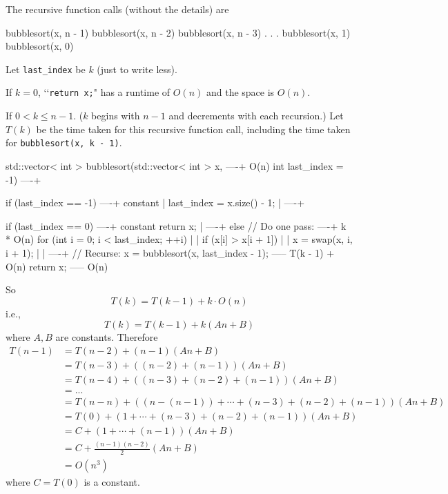 The recursive function calls (without the details) are
\begin{console}
bubblesort(x, n - 1) 
bubblesort(x, n - 2)
bubblesort(x, n - 3)
.
.
.
bubblesort(x, 1)
bubblesort(x, 0)
\end{console}
Let \verb!last_index! be $k$ (just to write less).

If $k = 0$,
\lq\lq \verb!return x;!" has a runtime of $O(n)$
and the space is $O(n)$.

If $0 < k \leq n - 1$.
($k$ begins with $n - 1$ and decrements with each
recursion.)
Let $T(k)$ be the time taken for this recursive
function call, including the time taken for 
\verb!bubblesort(x, k - 1)!.
\begin{console}[fontsize=\scriptsize]
                                                     
std::vector< int > bubblesort(std::vector< int > x, ----+ O(n) 
                              int last_index = -1)  ----+
{
    if (last_index == -1)                           ----+ constant
    {                                                   |
        last_index = x.size() - 1;                      |
    }                                               ----+

    if (last_index == 0)
    {                                               ----+ constant
        return x;                                       |
    }                                               ----+
    else                                            
    {                                               
        // Do one pass:                             ----+ k * O(n) 
        for (int i = 0; i < last_index; ++i)            |
        {                                               |
            if (x[i] > x[i + 1])                        |
            {                                           |
                x = swap(x, i, i + 1);                  |
            }                                           |
        }                                           ----+
        // Recurse:                                 
        x = bubblesort(x, last_index - 1);          ----- T(k - 1) + O(n) 
        return x;                                   ----- O(n)
    }
}
\end{console}
So
\[
T(k) = T(k - 1) + k \cdot O(n)
\]
i.e.,
\[
T(k) = T(k - 1) + k(An + B)
\]
where $A,B$ are constants.
Therefore
\begin{align*}
T(n - 1)
&= T(n - 2) + (n - 1)(An + B) \\
&= T(n - 3) + ((n-2)+(n-1))(An + B) \\
&= T(n - 4) + ((n - 3) + (n-2) + (n-1))(An + B) \\
&= ... \\
&= T(n - n) + ((n - (n-1)) + \cdots + (n - 3) + (n-2) + (n-1))(An + B) \\
&= T(0) + (1 + \cdots + (n - 3) + (n-2) + (n-1))(An + B) \\
&= C + (1 + \cdots + (n-1))(An + B) \\
&= C + \frac{(n-1)(n-2)}{2}(An + B) \\
&= O(n^3)
\end{align*}
where $C = T(0)$ is a constant.
